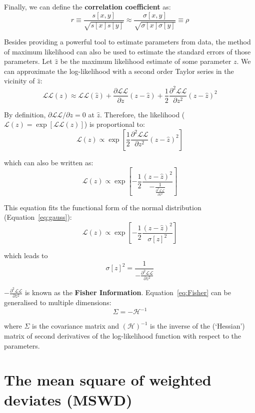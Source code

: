\begin{refsection}
Finally, we can define the \textbf{correlation coefficient} as:
\begin{equation}
  r \equiv \frac{s[x,y]}{\sqrt{s[x]s[y]}} 
  \approx 
  \frac{\sigma[x,y]}{\sqrt{\sigma[x]\sigma[y]}}
  \equiv \rho
  \label{eq:r}
\end{equation}

Besides providing a powerful tool to estimate parameters from data,
the method of maximum likelihood can also be used to estimate the
standard errors of those parameters. Let $\hat{z}$ be the maximum
likelihood estimate of some parameter $z$. We can approximate the
log-likelihood with a second order Taylor series in the vicinity of
$\hat{z}$:
\[
  \mathcal{LL}(z) \approx \mathcal{LL}(\hat{z}) +
  \frac{\partial\mathcal{LL}}{\partial{z}} (z-\hat{z}) +
  \frac{1}{2} \frac{\partial^2\mathcal{LL}}{\partial{z^2}} (z-\hat{z})^2
\]

By definition, $\partial{\mathcal{LL}}/\partial{z}=0$ at
$\hat{z}$. Therefore, the likelihood ($\mathcal{L}(z) =
\exp[\mathcal{LL}(z)]$) is proportional to:
\[
\mathcal{L}(z) \propto 
\exp\left[
  \frac{1}{2} \frac{\partial^2\mathcal{LL}}{\partial{z^2}} (z-\hat{z})^2
  \right]
\]

\noindent which can also be written as:
\[
\mathcal{L}(z) \propto \exp\!\left[
  -\frac{1}{2} \frac{(z-\hat{z})^2}{
    -\frac{1}{\frac{\partial^2\mathcal{LL}}{\partial{z^2}}}
  }\right]
\]

This equation fits the functional form of the normal distribution
(Equation~\ref{eq:gauss}):
\[
\mathcal{L}(z) \propto \exp\!\left[
  -\frac{1}{2} \frac{(z-\hat{z})^2}{\sigma[z]^2}
  \right]
\]

\noindent which leads to
\begin{equation}
  \sigma[z]^2 = \frac{1}{-\frac{\partial^2\mathcal{LL}}{\partial{z^2}}}
  \label{eq:Fisher}
\end{equation}

$-\frac{\partial^2\mathcal{LL}}{\partial{z^2}}$ is known as the
\textbf{Fisher Information}. Equation~\ref{eq:Fisher} can be
generalised to multiple dimensions:
\begin{equation}
  \Sigma = -\mathcal{H}^{-1}
  \label{eq:multidimFisher}
\end{equation}

\noindent where $\Sigma$ is the covariance matrix and
$(\mathcal{H})^{-1}$ is the inverse of the (`Hessian') matrix of
second derivatives of the log-likelihood function with respect to the
parameters.

\section{The mean square of weighted deviates (MSWD)}
\label{sec:mswd}


\end{refsection}
